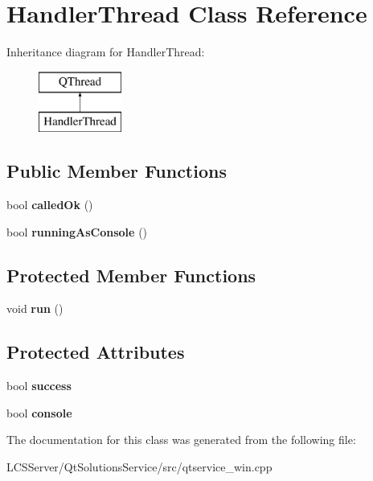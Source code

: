\hypertarget{class_handler_thread}{}\section{Handler\+Thread Class Reference}
\label{class_handler_thread}
Inheritance diagram for Handler\+Thread\+:\begin{figure}[H]
\begin{center}
\leavevmode
\includegraphics[height=2.000000cm]{class_handler_thread}
\end{center}
\end{figure}
\subsection*{Public Member Functions}
\begin{DoxyCompactItemize}
\item 
\mbox{\label{class_handler_thread_a2425fd3ef03366b018c39cf6e1197383}} 
bool {\bfseries called\+Ok} ()
\item 
\mbox{\label{class_handler_thread_af6b14aa00f655a01d9d7f9f37e755a01}} 
bool {\bfseries running\+As\+Console} ()
\end{DoxyCompactItemize}
\subsection*{Protected Member Functions}
\begin{DoxyCompactItemize}
\item 
\mbox{\label{class_handler_thread_a1b8072811a6f79a18f332054d05d4a0d}} 
void {\bfseries run} ()
\end{DoxyCompactItemize}
\subsection*{Protected Attributes}
\begin{DoxyCompactItemize}
\item 
\mbox{\label{class_handler_thread_ae939de0dcd9efdfbdda0bc8a67320241}} 
bool {\bfseries success}
\item 
\mbox{\label{class_handler_thread_a094154c070cd65f1cf971d022b6966eb}} 
bool {\bfseries console}
\end{DoxyCompactItemize}


The documentation for this class was generated from the following file\+:\begin{DoxyCompactItemize}
\item 
L\+C\+S\+Server/\+Qt\+Solutions\+Service/src/qtservice\+\_\+win.\+cpp\end{DoxyCompactItemize}
